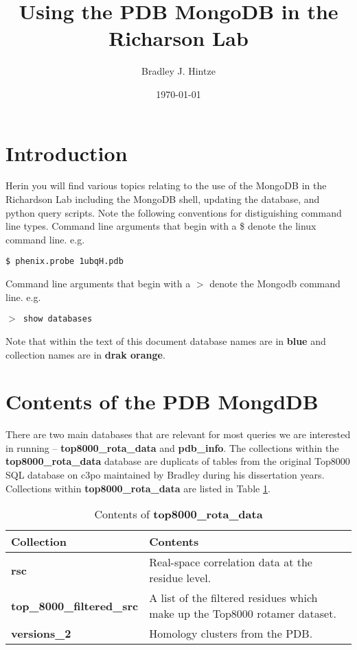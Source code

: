 \documentclass[12pt]{article}
\title{Using the PDB MongoDB in the Richarson Lab}
\author{Bradley J. Hintze}
\date{\today}
\newcommand{\cmdline}[1]{\vspace{5mm} \noindent
\texttt{\$ #1}
\vspace{5mm}

}
\newcommand{\mdbcmdline}[1]{\vspace{5mm} \noindent
\texttt{$>$ #1}
\vspace{5mm}

}
\newcommand{\mdbdb}[1]{{\color{BlueViolet}\textbf{#1}}}
\newcommand{\mdbcol}[1]{{\color{Bittersweet}\textbf{#1}}}
\begin{document}
\maketitle
\tableofcontents
\newpage

\section{Introduction}
Herin you will find various topics relating to the use of the MongoDB in the Richardson Lab including the MongoDB shell, updating the database, and python query scripts.
Note the following conventions for distiguishing command line types.
Command line arguments that begin with a \$ denote the linux command line. e.g.

\cmdline{phenix.probe 1ubqH.pdb}
\noindent
Command line arguments that begin with a $>$ denote the Mongodb command line. e.g.

\mdbcmdline{show databases}

\noindent
Note that within the text of this document database names are in \mdbdb{blue} and collection names are in \mdbcol{drak orange}.

\section{Contents of the PDB MongdDB}
\label{sec:MongoDBContents}
There are two main databases that are relevant for most queries we are interested in running -- \mdbdb{top8000\_rota\_data} and \mdbdb{pdb\_info}.
The collections within the \mdbdb{top8000\_rota\_data} database are duplicats of tables from the original Top8000 SQL database on c3po maintained by Bradley during his dissertation years.
Collections within \mdbdb{top8000\_rota\_data} are listed in Table \ref{tab:T8kDB}.

\begin{table}[h]
\caption{Contents of \mdbdb{top8000\_rota\_data}}
\begin{tabular}{l|p{8cm}}
  \textbf{Collection} & \textbf{Contents} \\ \hline
  \mdbcol{rsc} & Real-space correlation data at the residue level. \\ \hline
  \mdbcol{top\_8000\_filtered\_src} & A list of the filtered residues which make up the Top8000 rotamer dataset. \\ 
   \mdbcol{versions\_2} & Homology clusters from the PDB. \\ \hline
\end{tabular}
\label{tab:T8kDB}
\end{table}
\end{document}
